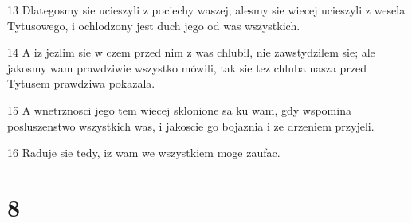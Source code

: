 \par 13 Dlategosmy sie ucieszyli z pociechy waszej; alesmy sie wiecej ucieszyli z wesela Tytusowego, i ochlodzony jest duch jego od was wszystkich.
\par 14 A iz jezlim sie w czem przed nim z was chlubil, nie zawstydzilem sie; ale jakosmy wam prawdziwie wszystko mówili, tak sie tez chluba nasza przed Tytusem prawdziwa pokazala.
\par 15 A wnetrznosci jego tem wiecej sklonione sa ku wam, gdy wspomina posluszenstwo wszystkich was, i jakoscie go bojaznia i ze drzeniem przyjeli.
\par 16 Raduje sie tedy, iz wam we wszystkiem moge zaufac.

\chapter{8}

